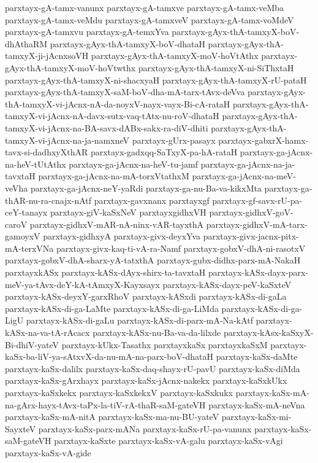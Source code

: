 {parxtayx-gA-tamx-vanunx
parxtayx-gA-tamxve
parxtayx-gA-tamx-veMba
parxtayx-gA-tamx-veMdu
parxtayx-gA-tamxveV
parxtayx-gA-tamx-voMdeV
parxtayx-gA-tamxvu
parxtayx-gA-temxYva
parxtayx-gAyx-thA-tamxyX-boV-dhAthaRM
parxtayx-gAyx-thA-tamxyX-boV-dhataH
parxtayx-gAyx-thA-tamxyX-ji-jAcnxsoVH
parxtayx-gAyx-thA-tamxyX-moV-hoVtAthx
parxtayx-gAyx-thA-tamxyX-moV-hoVtwthx
parxtayx-gAyx-thA-tamxyX-ni-SiThxtaH
parxtayx-gAyx-thA-tamxyX-ni-shacxyaH
parxtayx-gAyx-thA-tamxyX-rU-pataH
parxtayx-gAyx-thA-tamxyX-saM-boV-dha-mA-tarx-tAvx-deVva
parxtayx-gAyx-thA-tamxyX-vi-jAcnx-nA-da-noyxV-nayx-vayx-Bi-cA-rataH
parxtayx-gAyx-thA-tamxyX-vi-jAcnx-nA-davx-sutx-vaq-tAtx-nu-roV-dhataH
parxtayx-gAyx-thA-tamxyX-vi-jAcnx-na-BA-savx-dABx-sakx-ra-diV-dhiti
parxtayx-gAyx-thA-tamxyX-vi-jAcnx-na-ja-namxneV
parxtayx-gUrx-pasayx
parxtayx-gabxrX-hamx-tavx-si-dadhxyXthAR
parxtayx-gadxqq-SaTxyX-pa-hA-rataH
parxtayx-ga-jAcnx-na-heV-tUtAthx
parxtayx-ga-jAcnx-na-heV-tu-jamf
parxtayx-ga-jAcnx-na-ja-tavxtaH
parxtayx-ga-jAcnx-na-mA-torxVtathxM
parxtayx-ga-jAcnx-na-meV-veVha
parxtayx-ga-jAcnx-neY-yaRdi
parxtayx-ga-nu-Ba-va-kikxMta
parxtayx-ga-thAR-nu-ra-cnajx-nAtf
parxtayx-gavxnanx
parxtayxgf
parxtayx-gf-savx-rU-pa-ceY-tanayx
parxtayx-giV-kaSxNeV
parxtayxgidhxVH
parxtayx-gidhxV-goV-caroV
parxtayx-gidhxV-mAR-nA-ninx-vAR-tayxthA
parxtayx-gidhxV-mA-tarx-gamoyxV
parxtayx-gidhxyA
parxtayx-givx-deyxYva
parxtayx-givx-jacnx-pitx-mA-terxVNa
parxtayx-givx-kaq-ti-vA-ra-Namf
parxtayx-gobxV-dhA-ni-rasotxV
parxtayx-gobxV-dhA-sharx-yA-tatxthA
parxtayx-gubx-didhx-parx-mA-NakaH
parxtayxkASx
parxtayx-kASx-dAyx-shirx-ta-tavxtaH
parxtayx-kASx-dayx-parx-meV-ya-tAvx-deY-kA-tAmxyX-Kayxsayx
parxtayx-kASx-dayx-peV-kaSxteV
parxtayx-kASx-deyxY-garxRhoV
parxtayx-kASxdi
parxtayx-kASx-di-gaLa
parxtayx-kASx-di-ga-LaMte
parxtayx-kASx-di-ga-LiMda
parxtayx-kASx-di-ga-LigU
parxtayx-kASx-di-gaLu
parxtayx-kASx-di-parx-mA-Na-kAtf
parxtayx-kASx-na-va-tA-rAcacx
parxtayx-kASx-nu-Ba-va-da-lilxde
parxtayx-kAsx-kaSxyX-Bi-dhiV-yateV
parxtayx-kUkx-Tasathx
parxtayxkaSx
parxtayxkaSxM
parxtayx-kaSx-ba-liV-ya-sAtxvX-da-nu-mA-na-parx-boV-dhataH
parxtayx-kaSx-daMte
parxtayx-kaSx-dalilx
parxtayx-kaSx-daq-shayx-rU-pavU
parxtayx-kaSx-diMda
parxtayx-kaSx-gArxhayx
parxtayx-kaSx-jAcnx-nakekx
parxtayx-kaSxkUkx
parxtayx-kaSxkekx
parxtayx-kaSxkekxV
parxtayx-kaSxkukx
parxtayx-kaSx-mA-na-gArx-hayx-tAvx-taPx-la-tiV-rA-thaR-saM-gateVH
parxtayx-kaSx-mA-neVna
parxtayx-kaSx-mA-nitA
parxtayx-kaSx-ma-nu-BU-yateV
parxtayx-kaSx-mi-SayxteV
parxtayx-kaSx-parx-mANa
parxtayx-kaSx-rU-pa-vanunx
parxtayx-kaSx-saM-gateVH
parxtayx-kaSxte
parxtayx-kaSx-vA-galu
parxtayx-kaSx-vAgi
parxtayx-kaSx-vA-gide
}
